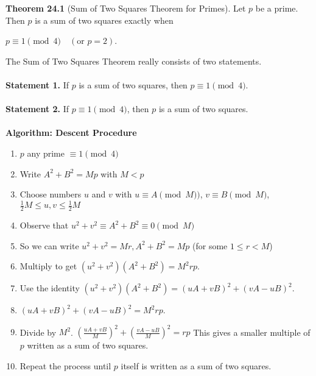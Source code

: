 \documentclass{article}
\begin{document}
\textbf{Theorem 24.1} (Sum of Two Squares Theorem for Primes). Let $p$ be a prime. Then $p$ is a sum of two squares exactly when
\begin{center}
$p\equiv1\pmod4 \quad (\text{or }p=2)$.
\end{center}
The Sum of Two Squares Theorem really consists of two statements.\\\\
\textbf{Statement 1.} If $p$ is a sum of two squares, then $p\equiv1\pmod4$.\\\\
\textbf{Statement 2.} If $p\equiv1\pmod4$, then $p$ is a sum of two squares.\\\\
\textbf{Algorithm: Descent Procedure}
\begin{enumerate}
\item $p$ any prime $\equiv 1\pmod4$
\item Write $A^2 + B^2 = Mp$ with $M < p$
\item Choose numbers $u$ and $v$ with $u\equiv A\pmod M)$, $v \equiv B \pmod M$, $\frac{1}{2}M \leqslant u, v \leqslant \frac{1}{2}M$
\item Observe that $u^2 + v^2 \equiv A^2 + B^2 \equiv 0 \pmod M$
\item So we can write $u^2+v^2 = Mr, A^2+B^2=Mp$ (for some $1\leqslant r < M$)
\item Multiply to get $(u^2+v^2)(A^2+B^2)=M^2rp$.
\item Use the identity $(u^2+v^2)(A^2+B^2)=(uA+vB)^2+(vA-uB)^2$.
\item $(uA+vB)^2+(vA-uB)^2 = M^2rp$.
\item Divide by $M^2$. $\left(\frac{uA+vB}{M}\right)^2 + \left(\frac{vA-uB}{M}\right)^2=rp$ This gives a smaller multiple of $p$ written as a sum of two squares. 
\item Repeat the process until $p$ itself is written as a sum of two squares.
\end{enumerate}
\end{document}

